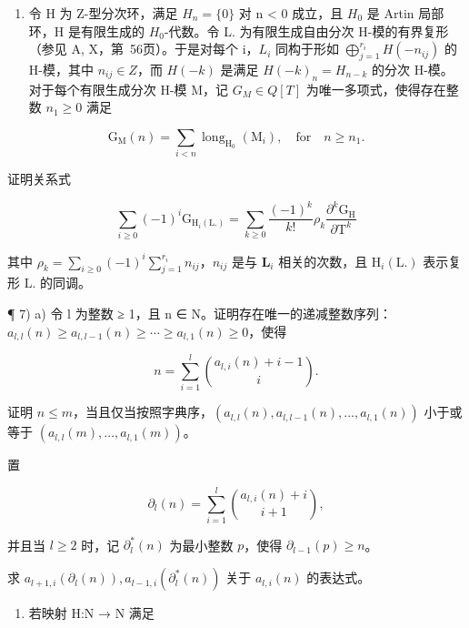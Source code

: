 \begin{enumerate}
\def\labelenumi{\arabic{enumi})}
\setcounter{enumi}{5}
\tightlist
\item
  令 H 为 Z-型分次环，满足 \(H_{n} = \{0\}\) 对 n \textless{} 0 成立，且 \(H_{0}\) 是 Artin 局部环，H 是有限生成的 \(H_{0}\)-代数。令 L. 为有限生成自由分次 H-模的有界复形（参见 A, X，第~56页）。于是对每个 i，\(L_{i}\) 同构于形如 \(\bigoplus_{j=1}^{r_{i}} H(-n_{ij})\) 的 H-模，其中 \(n_{ij} \in Z\)，而 \(H(-k)\) 是满足 \(H(-k)_{n} = H_{n-k}\) 的分次 H-模。对于每个有限生成分次 H-模 M，记 \(G_{M} \in Q[T]\) 为唯一多项式，使得存在整数 \(n_{1} \geqslant 0\) 满足
\end{enumerate}

\[
\mathrm{G} _ {\mathrm{M}} (n) = \sum_ {i <   n} \operatorname{long} _ {\mathrm{H} _ {0}} (\mathrm{M} _ {i}), \quad \text {for} \quad n \geqslant n _ {1}.
\]

证明关系式

\[
\sum_ {i \geqslant 0} (- 1) ^ {i} \mathrm{G} _ {\mathrm{H} _ {i} (\mathrm{L.})} = \sum_ {k \geqslant 0} \frac {(- 1) ^ {k}}{k !} \rho_ {k} \frac {\partial^ {k} \mathrm{G} _ {\mathrm{H}}}{\partial \mathrm{T} ^ {k}}
\]

其中 \(\rho_{k} = \sum_{i\geqslant 0}(-1)^{i}\sum_{j = 1}^{r_{i}}n_{ij}\)，\(n_{ij}\) 是与 \(\mathbf{L}_i\) 相关的次数，且 \(\mathrm{H}_i(\mathrm{L.})\) 表示复形 \(\mathrm{L.}\) 的同调。

¶ 7) a) 令 l 为整数 ≥ 1，且 n ∈ N。证明存在唯一的递减整数序列：\(a_{l,l}(n) \geqslant a_{l,l-1}(n) \geqslant \cdots \geqslant a_{l,1}(n) \geqslant 0\)，使得

\[
n = \sum_ {i = 1} ^ {l} \binom {a _ {l, i} (n) + i - 1} {i}.
\]

证明 \(n \leqslant m\)，当且仅当按照字典序，\((a_{l,l}(n), a_{l,l-1}(n), ..., a_{l,1}(n))\) 小于或等于 \((a_{l,l}(m), ..., a_{l,1}(m))\)。

置

\[
\partial_ {l} (n) = \sum_ {i = 1} ^ {l} \binom {a _ {l, i} (n) + i} {i + 1},
\]

并且当 \(l \geqslant 2\) 时，记 \(\partial_l^*(n)\) 为最小整数 \(p\)，使得 \(\partial_{l-1}(p) \geqslant n\)。

求 \(a_{l+1,i}(\partial_l(n)), a_{l-1,i}(\partial_l^*(n))\) 关于 \(a_{l,i}(n)\) 的表达式。

\begin{enumerate}
\def\labelenumi{\alph{enumi})}
\setcounter{enumi}{1}
\tightlist
\item
  若映射 H:N → N 满足
\end{enumerate}

